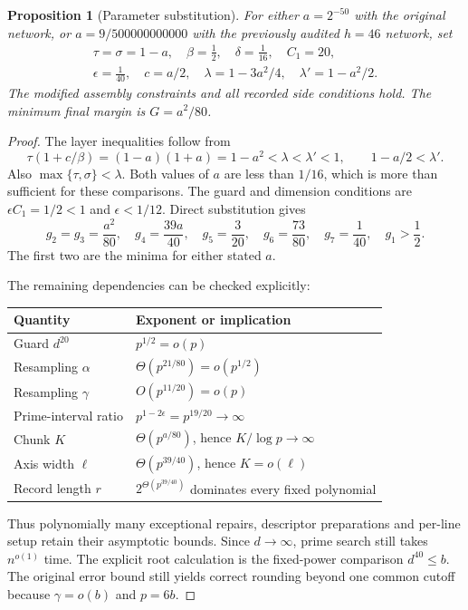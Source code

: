 \documentclass[11pt]{article}
\newtheorem{proposition}{Proposition}
\begin{document}
\begin{proposition}[Parameter substitution]
For either $a=2^{-50}$ with the original network, or
$a=9/500000000000$ with the previously audited $h=46$ network, set
\begin{gather*}
 \tau=\sigma=1-a,\quad \beta=\tfrac12,\quad
 \delta=\tfrac1{16},\quad C_1=20,\\
 \epsilon=\tfrac1{40},\quad c=a/2,\quad
 \lambda=1-3a^2/4,\quad \lambda'=1-a^2/2.
\end{gather*}
The modified assembly constraints and all recorded side conditions hold.
The minimum final margin is $G=a^2/80$.
\end{proposition}
\begin{proof}
The layer inequalities follow from
\[
 \tau(1+c/\beta)=(1-a)(1+a)=1-a^2<\lambda<\lambda'<1,
 \qquad 1-a/2<\lambda'.
\]
Also $\max\{\tau,\sigma\}<\lambda$. Both values of $a$ are less than
$1/16$, which is more than sufficient for these comparisons. The guard and
dimension conditions are $\epsilon C_1=1/2<1$ and $\epsilon<1/12$.
Direct substitution gives
\[
 g_2=g_3=\frac{a^2}{80},\quad
 g_4=\frac{39a}{40},\quad g_5=\frac3{20},\quad
 g_6=\frac{73}{80},\quad g_7=\frac1{40},\quad g_1>\frac12.
\]
The first two are the minima for either stated $a$.

The remaining dependencies can be checked explicitly:
\begin{center}
\begin{tabular}{ll}
\toprule
Quantity & Exponent or implication\\
\midrule
Guard $d^{20}$ & $p^{1/2}=o(p)$\\
Resampling $\alpha$ & $\Theta(p^{21/80})=o(p^{1/2})$\\
Resampling $\gamma$ & $O(p^{11/20})=o(p)$\\
Prime-interval ratio & $p^{1-2\epsilon}=p^{19/20}\to\infty$\\
Chunk $K$ & $\Theta(p^{a/80})$, hence $K/\log p\to\infty$\\
Axis width $\ell$ & $\Theta(p^{39/40})$, hence $K=o(\ell)$\\
Record length $r$ & $2^{\Theta(p^{39/40})}$ dominates every fixed polynomial\\
\bottomrule
\end{tabular}
\end{center}
Thus polynomially many exceptional repairs, descriptor preparations and
per-line setup retain their asymptotic bounds. Since $d\to\infty$, prime
search still takes $n^{o(1)}$ time. The explicit root calculation is the
fixed-power comparison $d^{40}\le b$. The original error bound still yields
correct rounding beyond one common cutoff because $\gamma=o(b)$ and $p=6b$.
\end{proof}
\end{document}
